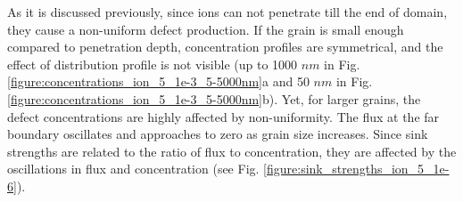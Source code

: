 \documentclass[a4paper]{article}
\begin{document}
      As it is discussed previously, since ions can not penetrate till the end of domain, they cause a non-uniform defect production. If the grain is small enough compared to penetration depth, concentration profiles are symmetrical, and the effect of distribution profile is not visible (up to 1000 $nm$ in Fig. \ref{figure:concentrations_ion_5_1e-3_5-5000nm}a and 50 $nm$ in Fig. \ref{figure:concentrations_ion_5_1e-3_5-5000nm}b). Yet, for larger grains, the defect concentrations are highly affected by non-uniformity. The flux at the far boundary oscillates and approaches to zero as grain size increases. Since sink strengths are related to the ratio of flux to concentration, they are affected by the oscillations in flux and concentration (see Fig. \ref{figure:sink_strengths_ion_5_1e-6}).

      \begin{figure}[h!]  %
        \centering
        \qquad

\end{figure}
\end{document}
